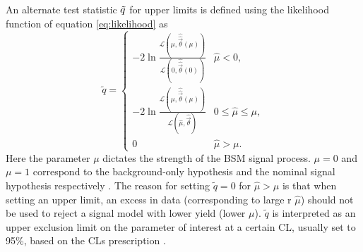 An alternate test statistic $\Tilde{q}$ for upper limits is defined using the likelihood function of equation \ref{eq:likelihood} as
\begin{equation}
    \tilde{q} = 
    \begin{cases}
        - 2 \ln \frac{\mathcal{L}( {\mu}, \hat{\hat{\vec{\theta}}}({\mu})) } {\mathcal{L}(0,         \hat{\hat{\vec{\theta}}}(0) )} & \hat\mu < 0, \\ 
        - 2 \ln \frac{\mathcal{L}( {\mu}, \hat{\hat{\vec{\theta}}}({\mu})) } {\mathcal{L}(\hat{\mu}, \hat{\vec{\theta}} )} & 0 \leq \hat\mu \leq \mu,  \\ 
        0 & \hat\mu > \mu.
    \end{cases}
    \label{eq:lambda_qtilde}
\end{equation}
Here the parameter $\mu$ dictates the strength of the BSM signal process. $\mu = 0$ and $\mu = 1$ correspond to the background-only hypothesis and the nominal signal hypothesis respectively \cite{m4l2021_paper}. The reason for setting $\tilde{q} = 0$ for $\hat{\mu} > \mu$ is that when setting an upper limit, an excess in data (corresponding to large r $\hat{\mu}$) should not be used to reject a signal model with lower yield (lower $\mu$). $\tilde{q}$ is interpreted as an upper
exclusion limit on the parameter of interest at a certain CL, usually set to 95\%, based on the CLs prescription \cite{CLs_technique} . 

